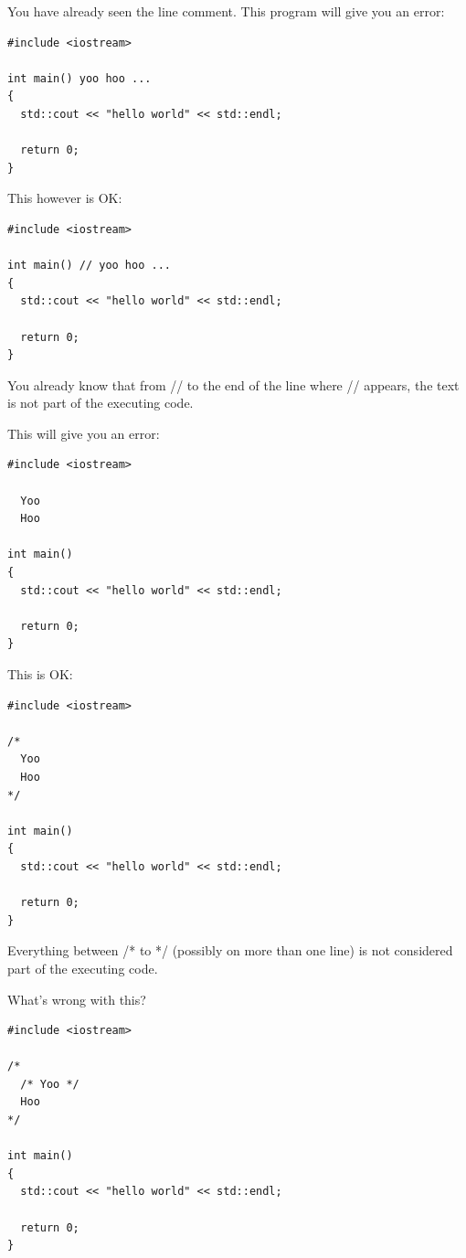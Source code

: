


You have already seen the line comment. This program will give you an error:
\begin{Verbatim}[frame=single, fontsize=\footnotesize]
#include <iostream>

int main() yoo hoo ...
{
  std::cout << "hello world" << std::endl;

  return 0;
}
\end{Verbatim}

This however is OK:

\begin{Verbatim}[frame=single, fontsize=\footnotesize]
#include <iostream>

int main() // yoo hoo ...
{
  std::cout << "hello world" << std::endl;

  return 0;
}
\end{Verbatim}

You already know that from // to the end of the line where // appears, the text is not part of the executing code.


This will give you an error:
\begin{Verbatim}[frame=single, fontsize=\footnotesize]
#include <iostream>

  Yoo
  Hoo

int main()
{
  std::cout << "hello world" << std::endl;

  return 0;
}
\end{Verbatim}

This is OK:
\begin{Verbatim}[frame=single, fontsize=\footnotesize]
#include <iostream>

/*
  Yoo
  Hoo
*/

int main()
{
  std::cout << "hello world" << std::endl;

  return 0;
}
\end{Verbatim}

Everything between /* to */ (possibly on more than one line) is not considered part of the executing code.

\begin{ex}
  What's wrong with this?
\begin{Verbatim}[frame=single, fontsize=\footnotesize]
#include <iostream>

/*
  /* Yoo */
  Hoo
*/

int main()
{
  std::cout << "hello world" << std::endl;

  return 0;
}
\end{Verbatim}
\end{ex}

